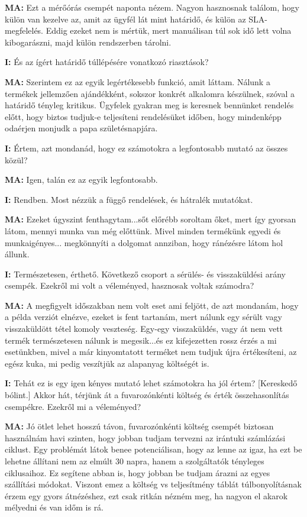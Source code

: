 \documentclass{imc-inf}
\begin{document}
\begin{appendices}
  \noindent\textbf{MA:} Ezt a mérőórás csempét naponta nézem. Nagyon hasznosnak találom, hogy külön van kezelve az, amit az ügyfél lát mint határidő, és külön az SLA-megfelelés. Eddig ezeket nem is mértük, mert manuálisan túl sok idő lett volna kibogarászni, majd külön rendszerben tárolni.

  \noindent\textbf{I:} És az ígért határidő túllépésére vonatkozó riasztások?

  \noindent\textbf{MA:} Szerintem ez az egyik legértékesebb funkció, amit láttam. Nálunk a termékek jellemzően ajándékként, sokszor konkrét alkalomra készülnek, szóval a határidő tényleg kritikus. Ügyfelek gyakran meg is keresnek bennünket rendelés előtt, hogy biztos tudjuk-e teljesíteni rendelésüket időben, hogy mindenképp odaérjen monjudk a papa születésnapjára.

  \noindent\textbf{I:} Értem, azt mondanád, hogy ez számotokra a legfontosabb mutató az összes közül?

  \noindent\textbf{MA:} Igen, talán ez az egyik legfontosabb.

  \noindent\textbf{I:} Rendben. Most nézzük a függő rendelések, és hátralék mutatókat.

  \noindent\textbf{MA:} Ezeket úgyszint fenthagytam...sőt előrébb soroltam őket, mert így gyorsan látom, mennyi munka van még előttünk. Mivel minden termékünk egyedi és munkaigényes... megkönnyíti a dolgomat annziban, hogy ránézésre látom hol állunk.

  \noindent\textbf{I:} Természetesen, érthető. Következő csoport a sérülés- és visszaküldési arány csempék. Ezekről mi volt a véleményed, hasznosak voltak számodra?

  \noindent\textbf{MA:} A megfigyelt időszakban nem volt eset ami feljött, de azt mondanám, hogy a példa verziót elnézve, ezeket is fent tartanám, mert nálunk egy sérült vagy visszaküldött tétel komoly veszteség. Egy-egy visszaküldés, vagy át nem vett termék természetesen nálunk is megesik...és ez kifejezetten rossz érzés a mi esetünkben, mivel a már kinyomtatott terméket nem tudjuk újra értékesíteni, az egész kuka, mi pedig veszítjük az alapanyag költségét is.

  \noindent\textbf{I:} Tehát ez is egy igen kényes mutató lehet számotokra ha jól értem? [Kereskedő bólint.] Akkor hát, térjünk át a fuvarozónkénti költség és érték összehasonlítás csempékre. Ezekről mi a véleményed?

  \noindent\textbf{MA:} Jó ötlet lehet hosszú távon, fuvarozónkénti költség csempét biztosan használnám havi szinten, hogy jobban tudjam tervezni az irántuki számlázási ciklust. Egy problémát látok benee potenciálisan, hogy az lenne az igaz, ha ezt be lehetne állítani nem az elmúlt 30 napra, hanem a szolgáltatók tényleges ciklusaihoz. Ez segítene abban is, hogy jobban be tudjam árazni az egyes szállítási módokat. Viszont emez a költség vs teljesítmény táblát túlbonyolításnak érzem egy gyors átnézéshez, ezt csak ritkán nézném meg, ha nagyon el akarok mélyedni és van időm is rá.


\end{appendices}
\end{document}
